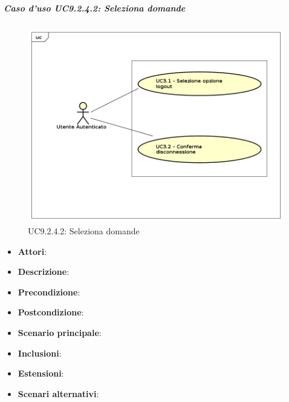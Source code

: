			\subparagraph{Caso d'uso UC9.2.4.2: Seleziona domande}	
			\label{UC9.2.4.2}
			\begin{figure}[h]
				\centering
			\includegraphics[scale=0.7,keepaspectratio]{UML/UC9.png}
				\caption{UC9.2.4.2: Seleziona domande}
			\end{figure}
			\FloatBarrier
			\begin{itemize}
				\item \textbf{Attori}: 
				\item \textbf{Descrizione}: 
				\item \textbf{Precondizione}: 
				\item \textbf{Postcondizione}: 
				\item \textbf{Scenario principale}:
				\item \textbf{Inclusioni}:
				\item \textbf{Estensioni}:
				\item \textbf{Scenari alternativi}:
			\end{itemize}
			
